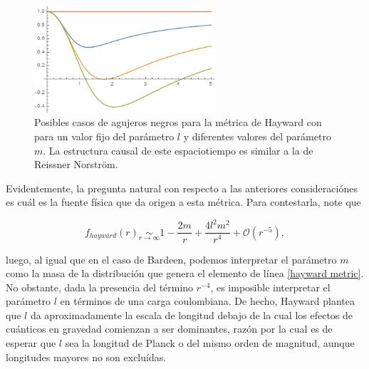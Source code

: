 \documentclass{article}
\numberwithin{equation}{section}
\theoremstyle{definition}
\begin{document}
\begin{figure}[h!]
	\centering
	\includegraphics[width=0.6\textwidth]{fhaywardAnalysis}
	\caption{Posibles casos de agujeros negros para la métrica de Hayward con para un valor fijo del parámetro $l$ y diferentes valores del parámetro $m$. La estructura causal de este espaciotiempo es similar a la de Reissner Norström.}
	\label{fig: fhayward analysis}
\end{figure}

%

Evidentemente, la pregunta natural con respecto a las anteriores consideraciónes es cuál es la fuente física que da origen a esta métrica. Para contestarla, note que 

\begin{equation}
f_{hayward}(r) \underset{r \to \infty}{\sim} 1 - \frac{2m}{r} + \frac{4l^2m^2}{r^4} + \mathcal{O}(r^{-5}),
\end{equation}

luego, al igual que en el caso de Bardeen, podemos interpretar el parámetro $m$ como la masa de la distribución que genera el elemento de línea \eqref{hayward metric}. No obstante, dada la presencia del término $r^{-4}$, es imposible interpretar el parámetro $l$ en términos de una carga coulombiana. De hecho, Hayward plantea que $l$ da aproximadamente la escala de longitud debajo de la cual los efectos de cuánticos en gravedad comienzan a ser dominantes, razón por la cual es de esperar que $l$ sea la longitud de Planck o del mismo orden de magnitud, aunque longitudes mayores no son excluídas.\\
\end{document}
